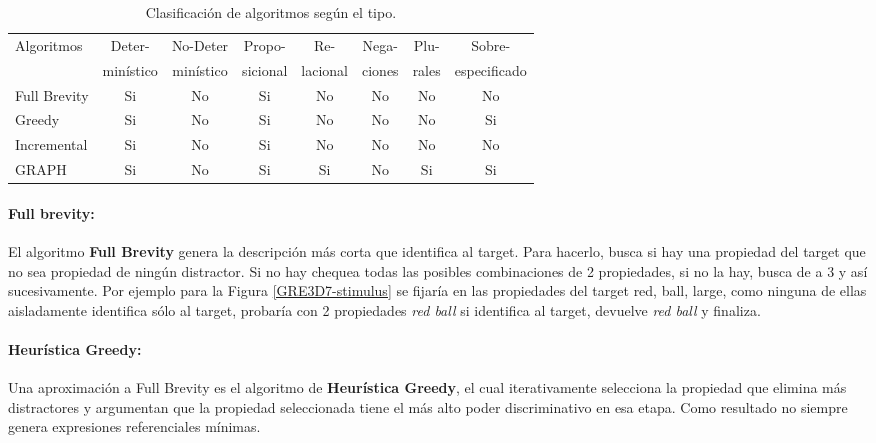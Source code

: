 \begin{table}[h!]
\begin{center}
\begin{tabular}{|l|c|c|c|c|c|c|c|}
\hline
 Algoritmos& Deter- & No-Deter & Propo- & Re- & Nega- & Plu- & Sobre- \\
 & min\'istico & min\'istico & sicional & lacional & ciones & rales & especificado \\
\hline
Full Brevity &Si & No&Si&No&No&No& No \\
Greedy&Si & No&Si&No&No&No& Si \\
Incremental&Si & No&Si&No&No&No& No \\
GRAPH&Si & No&Si&Si&No&Si& Si \\

\end{tabular}
\caption{Clasificaci\'on de algoritmos seg\'un el tipo.} 
\label{clasificacion_algoritmos}
\vspace*{-.5cm}
\end{center}
\end{table}


 


\paragraph{Full brevity:} El algoritmo {\bf Full Brevity} \cite{Dale:1989:CUR:981623.981632} genera la descripci\'on m\'as corta que identifica al target. Para hacerlo, 
busca si hay una propiedad del target que no sea propiedad de ning\'un distractor. Si no hay chequea todas las posibles combinaciones de 2 propiedades, si no la hay, busca de a 3 y as\'i sucesivamente. Por ejemplo para la Figura \ref{GRE3D7-stimulus} se fijar\'ia en las propiedades del target {red, ball, large}, como ninguna de ellas aisladamente identifica s\'olo al target, probar\'ia con 2 propiedades {\it red ball} si identifica al target, devuelve {\it red ball} y finaliza.

\paragraph{Heur\'istica Greedy:} Una aproximaci\'on a Full Brevity es el algoritmo de {\bf Heur\'istica Greedy}, el cual iterativamente selecciona la propiedad que elimina m\'as distractores y argumentan que la propiedad seleccionada tiene el m\'as alto poder discriminativo en esa etapa. Como resultado no siempre genera expresiones referenciales m\'inimas.

